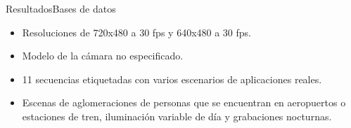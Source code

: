
\begin{frame}{Resultados}{Bases de datos}

\begin{itemize}
    \justifying
    \item Resoluciones de 720x480 a 30 fps y 640x480 a 30 fps.
    \item Modelo de la cámara no especificado.
    \item 11 secuencias etiquetadas con varios escenarios de aplicaciones reales.
    \item Escenas de aglomeraciones de personas que se encuentran en aeropuertos o estaciones de tren, iluminación variable de día y grabaciones nocturnas.
\end{itemize}

\vspace{0.1cm}


\end{frame}
